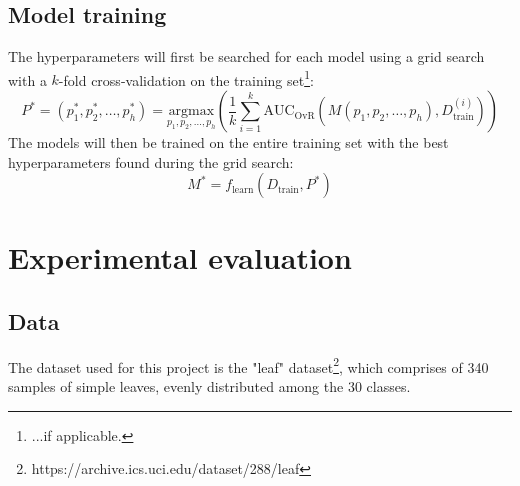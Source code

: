 \documentclass{article}
\begin{document}
\subsection{Model training}
The hyperparameters will first be searched for each model using a grid search with a $k$-fold cross-validation on the training set\footnote{...if applicable.}:
\begin{equation*}
    P^{*} = 
    (p_{1}^{*}, p_{2}^{*}, \dots, p_{h}^{*}) = 
    \underset{p_{1}, p_{2}, \dots, p_{h}}{\text{argmax}}
        \left(\frac{1}{k}\sum_{i=1}^{k}\text{AUC}_{\text{OvR}}
            (M(p_{1}, p_{2}, \dots, p_{h}), 
            D_{\text{train}}^{(i)})
        \right)
\end{equation*}
The models will then be trained on the entire training set with the best hyperparameters found during the grid search:
\begin{equation*}
    M^{*} = f_{\text{learn}}{(D_{\text{train}}, P^{*})}
\end{equation*}



\section{Experimental evaluation}



\subsection{Data}
The dataset used for this project is the "leaf" dataset\footnote{https://archive.ics.uci.edu/dataset/288/leaf}, 
which comprises of 340 samples of simple leaves, evenly distributed among the 30 classes.
\end{document}
